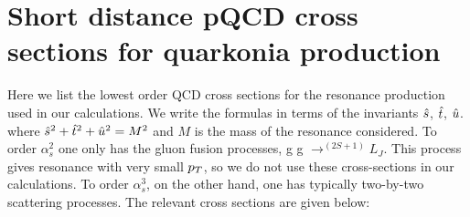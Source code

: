 \documentclass[aps,prc,preprint,superscriptaddress,showpacs,showkeys,amsmath]{revtex4-1}
\begin{document}
\section{Short distance pQCD cross sections for quarkonia production}
\label{section:pqcd}
  Here we list the lowest order QCD cross sections for the resonance production used 
in our calculations. We write the formulas in terms of the invariants ${\hat{s}}$, ${\hat{t}}$, ${\hat{u}}$.
where ${\hat{s}}^2 + {\hat{t}}^2 + {\hat{u}}^2 = M^2$ and $M$ is the mass of the resonance considered.
  To order $\alpha_{s}^{2}$ one only has the gluon fusion processes, 
g g $\rightarrow ^{(2S+1)}L_{J}$. This process gives resonance with very small $p_{T}$, 
so we do not use these cross-sections in our calculations.
To order $\alpha_{s}^{3}$, on the other hand, one has typically two-by-two 
scattering processes. The relevant cross sections are given below:
\end{document}
